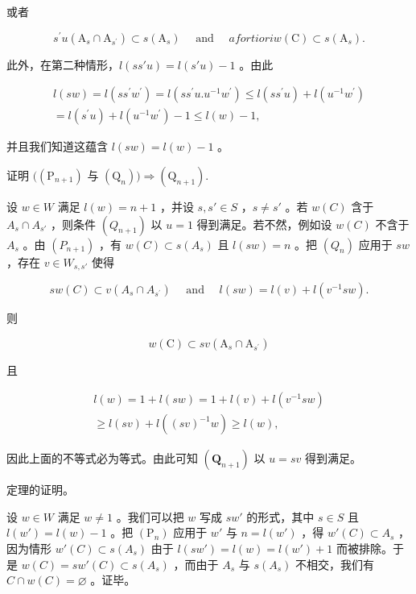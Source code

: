 或者

\[
  s ^ {\prime} u \left(\mathrm{A} _ {s} \cap \mathrm{A} _ {s ^ {\prime}}\right) \subset s \left(\mathrm{A} _ {s}\right) \quad \text { and } \quad a fortiori w (\mathrm{C}) \subset s \left(\mathrm{A} _ {s}\right).
\]

此外，在第二种情形，\(l(ss'u) = l(s'u) - 1\) 。由此

\[
\begin{array}{c} l (s w) = l (s s ^ {\prime} w ^ {\prime}) = l (s s ^ {\prime} u. u ^ {- 1} w ^ {\prime}) \leqslant l (s s ^ {\prime} u) + l (u ^ {- 1} w ^ {\prime}) \\ = l (s ^ {\prime} u) + l (u ^ {- 1} w ^ {\prime}) - 1 \leqslant l (w) - 1, \end{array}
\]

并且我们知道这蕴含 \(l(sw) = l(w) - 1\) 。

证明 \(((\mathrm{P}_{n + 1})\) 与 \((\mathrm{Q}_n))\Longrightarrow (\mathrm{Q}_{n + 1}).\)

设 \(w \in W\) 满足 \(l(w) = n + 1\) ，并设 \(s, s' \in S\) ，\(s \neq s'\) 。若 \(w(C)\) 含于 \(A_s \cap A_{s'}\) ，则条件 \((Q_{n+1})\) 以 \(u = 1\) 得到满足。若不然，例如设 \(w(C)\) 不含于 \(A_s\) 。由 \((P_{n+1})\) ，有 \(w(C) \subset s(A_s)\) 且 \(l(sw) = n\) 。把 \((Q_n)\) 应用于 \(sw\) ，存在 \(v \in W_{s,s'}\) 使得

\[
s w (C) \subset v \left(A _ {s} \cap A _ {s ^ {\prime}}\right) \quad \text { and } \quad l (s w) = l (v) + l \left(v ^ {- 1} s w\right).
\]

则

\[
w (\mathrm{C}) \subset s v \left(\mathrm{A} _ {s} \cap \mathrm{A} _ {s ^ {\prime}}\right)
\]

且

\[
\begin{array}{c} l (w) = 1 + l (s w) = 1 + l (v) + l (v ^ {- 1} s w) \\ \geqslant l (s v) + l ((s v) ^ {- 1} w) \geqslant l (w), \end{array}
\]

因此上面的不等式必为等式。由此可知 \((\mathbf{Q}_{n + 1})\) 以 \(u = sv\) 得到满足。

定理的证明。

设 \(w \in W\) 满足 \(w \neq 1\) 。我们可以把 \(w\) 写成 \(sw'\) 的形式，其中 \(s \in S\) 且 \(l(w') = l(w) - 1\) 。把 \((\mathrm{P}_n)\) 应用于 \(w'\) 与 \(n = l(w')\) ，得 \(w'(C) \subset A_s\) ，因为情形 \(w'(C) \subset s(A_s)\) 由于 \(l(sw') = l(w) = l(w') + 1\) 而被排除。于是 \(w(C) = sw'(C) \subset s(A_s)\) ，而由于 \(A_s\) 与 \(s(A_s)\) 不相交，我们有 \(C \cap w(C) = \varnothing\) 。证毕。

